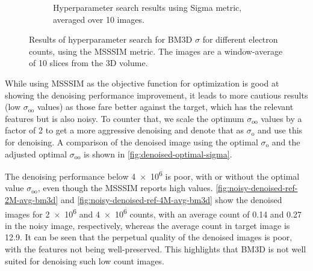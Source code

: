 \begin{figure}
\begin{subfigure}[t]{0.49\linewidth}
        \caption{Hyperparameter search results using Sigma metric, averaged over 10 images.}
        \label{fig:hyperparameter-sigma-averaged-10-images}
    \end{subfigure}
    \caption{Results of hyperparameter search for \gls{BM3D} $\sigma$ for different electron counts, using the \gls{MSSSIM} metric. The images are a window-average of \num{10} slices from the 3D volume.}
    \label{fig:hyperparameter-averaged-10-images}
\end{figure}

While using \gls{MSSSIM} as the objective function for optimization is good at showing the denoising performance improvement, it leads to more cautious results (low $\sigma_{\text{oo}}$ values) as those fare better against the target, which has the relevant features but is also noisy. To counter that, we scale the optimum $\sigma_{\text{oo}}$ values by a factor of 2 to get a more aggressive denoising and denote that as $\sigma_{\text{o}}$ and use this for denoising. A comparison of the denoised image using the optimal $\sigma_{\text{o}}$ and the adjusted optimal $\sigma_{\text{oo}}$ is shown in \cref{fig:denoised-optimal-sigma}.

The denoising performance below \num{4e6} is poor, with or without the optimal value $\sigma_{\text{oo}}$, even though the \gls{MSSSIM} reports high values. \cref{fig:noisy-denoised-ref-2M-avg-bm3d} and \cref{fig:noisy-denoised-ref-4M-avg-bm3d} show the denoised images for \num{2e6} and \num{4e6} counts, with an average count of \num{0.14} and \num{0.27} in the noisy image, respectively, whereas the average count in target image is \num{12.9}. It can be seen that the perpetual quality of the denoised images is poor, with the features not being well-preserved. This highlights that \gls{BM3D} is not well suited for denoising such low count images.

